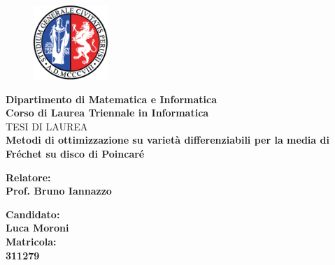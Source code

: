 \documentclass[a4paper, 12pt]{article}
\begin{document}
\begin{titlepage} %
\begin{figure}[t] %
    \centering\includegraphics[width=0.25\textwidth]{logo_unipg}
\end{figure}
\vspace{20mm}

\begin{Large}
 \begin{center}
	\textbf{Dipartimento di Matematica e Informatica\\ Corso di Laurea Triennale in Informatica\\}
	\vspace{20mm}
    {\LARGE{TESI DI LAUREA}}\\
	\vspace{10mm}
	{\huge{\bf Metodi di ottimizzazione su varietà differenziabili per la media di Fréchet su disco di Poincaré}}\\
\end{center}
\end{Large}

\vspace{30mm}
\begin{minipage}[t]{0.47\textwidth}
	{\large{\bf Relatore:\\ Prof. Bruno Iannazzo}}
\end{minipage}
\hfill
\begin{minipage}[t]{0.47\textwidth}\raggedleft
	{\large{\bf Candidato: \\ Luca Moroni\\ }}
	\vspace{5mm}
	{\large{\bf Matricola: \\ 311279\\ }}
\end{minipage}

\vspace{25mm}

\hrulefill

\vspace{5mm}


\end{titlepage}
\end{document}
